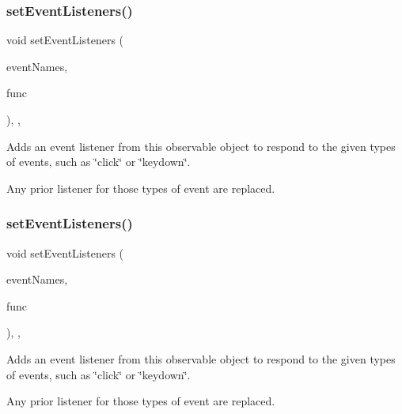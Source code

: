 \subsubsection{\texorpdfstring{set\+Event\+Listeners()}{setEventListeners()}\hspace{0.1cm}{\footnotesize\ttfamily [1/2]}}
{\footnotesize\ttfamily void set\+Event\+Listeners (\begin{DoxyParamCaption}\item[{std\+::initializer\+\_\+list$<$ std\+::string $>$}]{event\+Names,  }\item[{G\+Event\+Listener}]{func }\end{DoxyParamCaption})\hspace{0.3cm}{\ttfamily [protected]}, {\ttfamily [virtual]}, {\ttfamily [inherited]}}



Adds an event listener from this observable object to respond to the given types of events, such as \char`\"{}click\char`\"{} or \char`\"{}keydown\char`\"{}. 

Any prior listener for those types of event are replaced. \mbox{\label{classGObservable_a7867184bbb686f74fae8a4db927da799}} 
\subsubsection{\texorpdfstring{set\+Event\+Listeners()}{setEventListeners()}\hspace{0.1cm}{\footnotesize\ttfamily [2/2]}}
{\footnotesize\ttfamily void set\+Event\+Listeners (\begin{DoxyParamCaption}\item[{std\+::initializer\+\_\+list$<$ std\+::string $>$}]{event\+Names,  }\item[{G\+Event\+Listener\+Void}]{func }\end{DoxyParamCaption})\hspace{0.3cm}{\ttfamily [protected]}, {\ttfamily [virtual]}, {\ttfamily [inherited]}}



Adds an event listener from this observable object to respond to the given types of events, such as \char`\"{}click\char`\"{} or \char`\"{}keydown\char`\"{}. 

Any prior listener for those types of event are replaced. \mbox{\label{classGObservable_afaa30b2a9e0f378fd1c70d2f1d0b8216}} 
